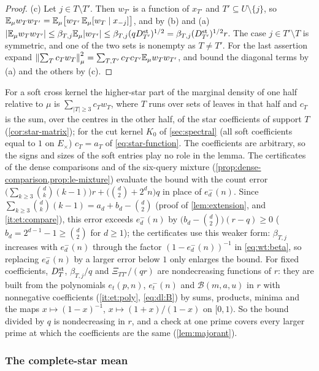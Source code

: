 \begin{proof}
(c) Let $j\in T\setminus T'$. Then $w_{T'}$ is a function of $x_{T'}$ and
$T'\subseteq U\setminus\{j\}$, so
$\mathbb E_\mu w_Tw_{T'}=\mathbb E_\mu\big[w_{T'}\,\mathbb E_\mu[w_T\mid x_{-j}]\big]$, and by (b) and (a)
$|\mathbb E_\mu w_Tw_{T'}|\le\beta_{T,j}\mathbb E_\mu|w_{T'}|\le\beta_{T,j}(qD^{\rm st}_{T'})^{1/2}
=\beta_{T,j}(D^{\rm st}_{T'})^{1/2}r$. The case $j\in T'\setminus T$ is symmetric,
and one of the two sets is nonempty as $T\ne T'$. For the last assertion expand
$\left\|\sum_Tc_Tw_T\right\|^2_\mu=\sum_{T,T'}c_Tc_{T'}\mathbb E_\mu w_Tw_{T'}$, and bound the
diagonal terms by (a) and the others by (c).
\end{proof}

For a soft cross kernel the higher-star part of the marginal density of one half relative to $\mu$ is $\sum_{|T|\ge3}c_Tw_T$, where $T$ runs over sets of leaves in that half
and $c_T$ is the sum, over the centres in the other half, of the star
coefficients of support $T$ (\cref{cor:star-matrix}); for the cut kernel $K_0$ of \cref{sec:spectral} (all soft coefficients equal to $1$ on $E_\times$) $c_T=a_T$ of \eqref{eq:star-function}. The coefficients are arbitrary, so the
signs and sizes of the soft entries play no role in the lemma. The certificates
of the dense comparisons and of the six-query mixture
(\cref{prop:dense-comparison,prop:le-mixture}) evaluate the bound with the count
error $\big(\sum_{k\ge3}\binom dk(k-1)\big)r+\big(\binom d2+2^dn\big)q$ in place of
$e^-_d(n)$. Since $\sum_{k\ge3}\binom dk(k-1)=a_d+b_d-\binom d2$ (proof of
\cref{lem:extension}, and \ref{it:et:compare}), this error exceeds $e^-_d(n)$ by
$\big(b_d-\binom d2\big)(r-q)\ge0$ ($b_d=2^{d-1}-1\ge\binom d2$ for $d\ge1$); the
certificates use this weaker form: $\beta_{T,j}$ increases with $e^-_d(n)$ through the factor $(1-e^-_d(n))^{-1}$ in \eqref{eq:wt:beta}, so replacing $e^-_d(n)$ by a larger error below $1$ only enlarges the bound. For fixed coefficients, $D^{\rm st}_T$,
$\beta_{T,j}/q$ and $\Xi_{TT'}/(qr)$ are nondecreasing functions of $r$: they are
built from the polynomials $e_t(p,n)$, $e^-_t(n)$ and $\mathcal B(m,a,u)$ in $r$
with nonnegative coefficients (\ref{it:et:poly}, \eqref{eq:dl:B}) by sums,
products, minima and the maps $x\mapsto(1-x)^{-1}$, $x\mapsto(1+x)/(1-x)$ on
$[0,1)$. So the bound divided by $q$ is nondecreasing in $r$, and a check at one
prime covers every larger prime at which the coefficients are the same
(\cref{lem:majorant}).

\subsubsection{The complete-star mean}\label{subsec:advance:star-normalizer}

